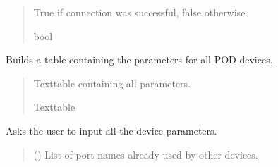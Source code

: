\documentclass[letterpaper,10pt,english]{sphinxmanual}
\begin{document}
\begin{fulllineitems}
\begin{fulllineitems}
\begin{quote}
\begin{description}
\begin{itemize}
\end{itemize}

\sphinxAtStartPar
True if connection was successful, false otherwise.

\sphinxAtStartPar
bool

\end{description}\end{quote}

\end{fulllineitems}


\begin{fulllineitems}
\label{\detokenize{Setup_8206HR:Setup_8206HR.Setup_8206HR._GetPODdeviceParameterTable}}
\pysigstartsignatures
{}
\pysigstopsignatures
\sphinxAtStartPar
Builds a table containing the parameters for all POD devices.
\begin{quote}\begin{description}
\sphinxAtStartPar
Texttable containing all parameters.

\sphinxAtStartPar
Texttable

\end{description}\end{quote}

\end{fulllineitems}


\begin{fulllineitems}
\label{\detokenize{Setup_8206HR:Setup_8206HR.Setup_8206HR._GetParam_onePODdevice}}
\pysigstartsignatures
{}
\pysigstopsignatures
\sphinxAtStartPar
Asks the user to input all the device parameters.
\begin{quote}\begin{description}
\sphinxAtStartPar
{} (\sphinxstyleliteralemphasis{\sphinxupquote{{[}}}\sphinxstyleliteralemphasis{\sphinxupquote{{]}}}) \textendash{} List of port names already used by other devices.


\end{description}
\end{quote}
\end{fulllineitems}
\end{fulllineitems}
\end{document}
